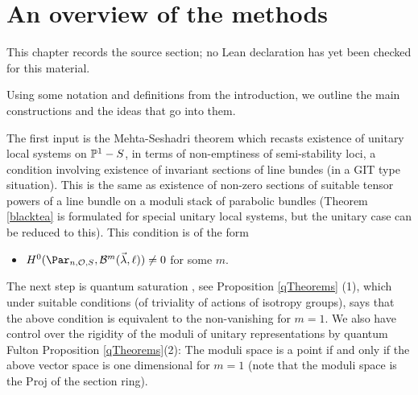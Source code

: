 \chapter{An overview of the methods}
\label{rigid-local-systems-multiplicative-eigenvalue-problem-chapter-02}

\begin{remark}
\label{rigid-local-systems-multiplicative-eigenvalue-problem-chapter-02-source}
This chapter records the source section; no Lean declaration has yet been checked for this material.
\notready
\end{remark}

\label{uber}
Using  some notation and definitions from the introduction, we outline the main constructions and the ideas that go into them.

The first input is the Mehta-Seshadri theorem \cite{MS} which recasts existence of unitary local systems on $\Bbb{P}^1-S$, in terms of non-emptiness of semi-stability loci, a condition involving existence of invariant sections of line bundes (in a GIT type situation). This is the same as existence of  non-zero sections of suitable tensor powers of a line bundle on a moduli stack of parabolic bundles (Theorem \ref{blacktea} is formulated for special unitary local systems, but the unitary case can be reduced to this). This condition is of the form
\begin{itemize}
\item
$H^0(\Par_{n,\mathcal{O},S},\mathcal{B}^m(\vec{\lambda},\ell))\neq 0$ for some $m$.
\end{itemize}

The next step is quantum saturation \cite{BHorn}, see  Proposition \ref{qTheorems} (1), which under  suitable conditions (of triviality of actions of isotropy groups), says that the above condition is equivalent to the non-vanishing for $m=1$.
We also have control over the rigidity of the moduli of unitary representations by quantum Fulton Proposition \ref{qTheorems}(2):  The moduli space is a point if and only if the above vector space is one dimensional for $m=1$ (note that the moduli space is the Proj of the section ring).


